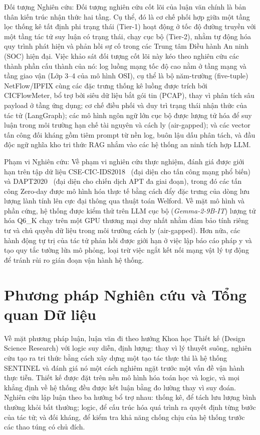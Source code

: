 Đối tượng Nghiên cứu: Đối tượng nghiên cứu cốt lõi của luận văn chính là bản thân kiến trúc nhận thức hai tầng. Cụ thể, đó là cơ chế phối hợp giữa một tầng lọc thống kê tất định phi trạng thái (Tier-1) hoạt động ở tốc độ đường truyền với một tầng tác tử suy luận có trạng thái, chạy cục bộ (Tier-2), nhằm tự động hóa quy trình phát hiện và phản hồi sự cố trong các Trung tâm Điều hành An ninh (SOC) hiện đại. Việc khảo sát đối tượng cốt lõi này kéo theo nghiên cứu các thành phần cấu thành của nó: log luồng mạng tốc độ cao nằm ở tầng mạng và tầng giao vận (Lớp 3--4 của mô hình OSI), cụ thể là bộ năm-trường (five-tuple) NetFlow/IPFIX cùng các đặc trưng thống kê luồng được trích bởi CICFlowMeter, bổ trợ bởi siêu dữ liệu bắt gói tin (PCAP), thay vì phân tích sâu payload ở tầng ứng dụng; cơ chế điều phối và duy trì trạng thái nhận thức của tác tử (LangGraph); các mô hình ngôn ngữ lớn cục bộ được lượng tử hóa để suy luận trong môi trường hạn chế tài nguyên và cách ly (air-gapped); và các vector tấn công đối kháng gồm tiêm prompt từ nền log, buôn lậu dấu phân tách, và đầu độc ngữ nghĩa kho tri thức RAG nhắm vào các hệ thống an ninh tích hợp LLM.

Phạm vi Nghiên cứu: Về phạm vi nghiên cứu thực nghiệm, đánh giá được giới hạn trên tập dữ liệu CSE-CIC-IDS2018~\cite{ids2018} (đại diện cho tấn công mạng phổ biến) và DAPT2020~\cite{dapt2020} (đại diện cho chiến dịch APT đa giai đoạn), trong đó các tấn công Zero-day được mô hình hóa thực tế bằng cách đẩy đặc trưng của dòng lưu lượng lành tính lên cực đại thông qua thuật toán Welford. Về mặt mô hình và phần cứng, hệ thống được kiểm thử trên LLM cục bộ (\textit{Gemma-2-9B-IT}) lượng tử hóa Q6\_K chạy trên một GPU thương mại duy nhất nhằm đảm bảo tính riêng tư và chủ quyền dữ liệu trong môi trường cách ly (air-gapped). Hơn nữa, các hành động tự trị của tác tử phản hồi được giới hạn ở việc lập báo cáo pháp y và tạo quy tắc tường lửa mô phỏng, loại trừ việc ngắt kết nối mạng vật lý tự động để tránh rủi ro gián đoạn vận hành hệ thống.

\section{Phương pháp Nghiên cứu và Tổng quan Dữ liệu}

Về mặt phương pháp luận, luận văn đi theo hướng Khoa học Thiết kế (Design Science Research) với logic suy diễn, định lượng: thay vì lý thuyết suông, nghiên cứu tạo ra tri thức bằng cách xây dựng một tạo tác thực thi là hệ thống SENTINEL và đánh giá nó một cách nghiêm ngặt trước một vấn đề vận hành thực tiễn. Thiết kế được đặt trên nền mô hình hóa toán học và logic, và mọi khẳng định về hệ thống đều được kết luận bằng đo lường thay vì suy đoán. Nghiên cứu lập luận theo ba hướng bổ trợ nhau: thống kê, để tách lưu lượng bình thường khỏi bất thường; logic, để cấu trúc hóa quá trình ra quyết định từng bước của tác tử; và đối kháng, để kiểm tra khả năng chống chịu của hệ thống trước các thao túng có chủ đích.

